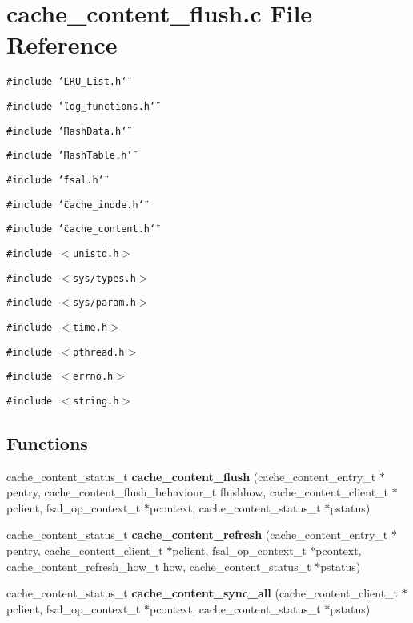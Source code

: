 \section{cache\_\-content\_\-flush.c File Reference}
\label{cache__content__flush_8c}
{\tt \#include \char`\"{}LRU\_\-List.h\char`\"{}}\par
{\tt \#include \char`\"{}log\_\-functions.h\char`\"{}}\par
{\tt \#include \char`\"{}HashData.h\char`\"{}}\par
{\tt \#include \char`\"{}HashTable.h\char`\"{}}\par
{\tt \#include \char`\"{}fsal.h\char`\"{}}\par
{\tt \#include \char`\"{}cache\_\-inode.h\char`\"{}}\par
{\tt \#include \char`\"{}cache\_\-content.h\char`\"{}}\par
{\tt \#include $<$unistd.h$>$}\par
{\tt \#include $<$sys/types.h$>$}\par
{\tt \#include $<$sys/param.h$>$}\par
{\tt \#include $<$time.h$>$}\par
{\tt \#include $<$pthread.h$>$}\par
{\tt \#include $<$errno.h$>$}\par
{\tt \#include $<$string.h$>$}\par
\subsection*{Functions}
\begin{CompactItemize}
\item 
cache\_\-content\_\-status\_\-t {\bf cache\_\-content\_\-flush} (cache\_\-content\_\-entry\_\-t $\ast$pentry, cache\_\-content\_\-flush\_\-behaviour\_\-t flushhow, cache\_\-content\_\-client\_\-t $\ast$pclient, fsal\_\-op\_\-context\_\-t $\ast$pcontext, cache\_\-content\_\-status\_\-t $\ast$pstatus)
\item 
cache\_\-content\_\-status\_\-t {\bf cache\_\-content\_\-refresh} (cache\_\-content\_\-entry\_\-t $\ast$pentry, cache\_\-content\_\-client\_\-t $\ast$pclient, fsal\_\-op\_\-context\_\-t $\ast$pcontext, cache\_\-content\_\-refresh\_\-how\_\-t how, cache\_\-content\_\-status\_\-t $\ast$pstatus)
\item 
cache\_\-content\_\-status\_\-t {\bf cache\_\-content\_\-sync\_\-all} (cache\_\-content\_\-client\_\-t $\ast$pclient, fsal\_\-op\_\-context\_\-t $\ast$pcontext, cache\_\-content\_\-status\_\-t $\ast$pstatus)
\end{CompactItemize}


